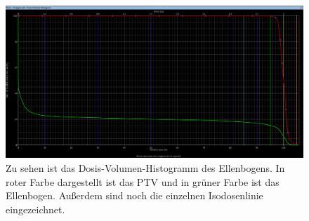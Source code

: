 \begin{figure}[htpb]
	\centering
	\includegraphics[width=0.7\linewidth]{../Bilder/DVH_EllenbogenEinzel}
	\caption{Zu sehen ist das Dosis-Volumen-Histogramm des Ellenbogens. In roter Farbe dargestellt ist das PTV und in grüner Farbe ist das Ellenbogen. Außerdem sind noch die einzelnen Isodosenlinie eingezeichnet.}
	\label{fig:dvhellenbogeneinzel}
\end{figure}

